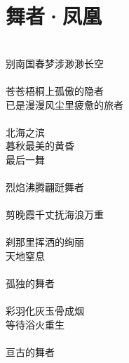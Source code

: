 \chapter{舞者·凤凰}

\leftskip=30mm
\noindent \\
别南国春梦\fspace 涉渺渺长空\\
\\
苍苍梧桐上孤傲的隐者\\
已是漫漫风尘里疲惫的旅者\\
\\
北海之滨\\
暮秋最美的黄昏\\
最后一舞\\
\\
烈焰沸腾\fspace 翩跹舞者\\
\\
剪晚霞千丈\fspace 抚海浪万重\\
\\
刹那里挥洒的绚丽\\
天地窒息\\
\\
孤独的舞者\\
\\
彩羽化灰\fspace 玉骨成烟\\
等待浴火重生\\
\\
亘古的舞者
